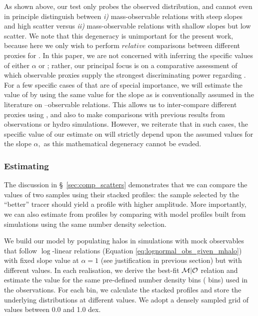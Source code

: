 \documentclass[fleqn,usenatbib,useAMS]{mnras}
\begin{document}
\begin{CJK*}{UTF8}{gbsn}
    As shown above, our \topn{} test only probes the observed \mvir{} distribution, and cannot even
    in principle distinguish between {\em i)} mass-observable relations with steep slopes and high
    scatter versus {\em ii)} mass-observable relations with shallow slopes but low scatter. 
    We note that this degeneracy is unimportant for the present work, because here we only wish to
    perform $relative$ comparisons between different proxies for \mvir{}. 
    In this paper, we are not concerned with inferring the specific values of either $\alpha$ or 
    \scatterObsSymMhalo{}; rather, our principal focus is on a comparative assessment of which
    observable proxies \obsSym{} supply the strongest discriminating power regarding \mvir{}. 
    For a few specific cases of \obsSym{} that are of special importance, we will estimate the value
    of \scatterObsSymMhalo{} by using the same value for the slope as is conventionally assumed in
    the literature on \mvir{}--observable relations.
    This allows us to inter-compare different proxies using \scatterObsSymMhalo{}, and also to make
    comparisons with previous results from observations or hydro simulations. 
    However, we reiterate that in such cases, the specific value of our estimate on
    \scatterObsSymMhalo{} will strictly depend upon the assumed values for the slope $\alpha,$ as
    this mathematical degeneracy cannot be evaded.

\subsubsection{Estimating \scatterMhaloObsSym{}}
    \label{sec:estimate_scatter}

    The discussion in \S\ \ref{sec:comp_scatters} demonstrates that we can compare the
    \scatterMhaloObsSym{} values of two \topn{} samples using their stacked \dsigma{} profiles:
    the sample selected by the ``better'' \mhalo{} tracer should yield a \dsigma{} profile with
    higher amplitude.
    More importantly, we can also estimate \scatterMhaloObsSym{} from \dsigma{} profiles by
    comparing with model profiles built from simulations using the same number density selection.

    We build our model by populating halos in simulations with mock observables that follow
    $\log$-linear relations (Equation \ref{eq:lognormal_obs_given_mhalo}) with fixed slope value at
    $\alpha = 1$ (see justification in previous section) but with different \scatterObsSymMhalo{}
    values.
    In each realisation, we derive the best-fit ${\mathcal{M}}| {\mathcal{O}}$ relation and estimate the
    \scatterMhaloObsSym{} value for the same pre-defined number density bins (\topn{} bins) used in
    the observations.
    For each \topn{} bin, we calculate the stacked \dsigma{} profiles and store the underlying
    \mhalo{} distributions at different \scatterMhaloObsSym{} values. 
    We adopt a densely sampled grid of \scatterMhaloObsSym{} values between 0.0 and 1.0 dex.


\end{CJK*}
\end{document}
